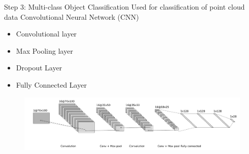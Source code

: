 \documentclass[9pt]{beamer}
\begin{document}



\begin{frame}[fragile]{Step 3: Multi-class Object Classification}
	Used for classification of point cloud data Convolutional Neural Network (CNN)

	\begin{itemize}
		\item Convolutional layer
		\item Max Pooling layer
		\item Dropout Layer
		\item Fully Connected Layer
	\end{itemize}

	\begin{figure}
		\centering
		\includegraphics[width=\textwidth]{images/object_net.pdf}

	\end{figure}
\end{frame}

\end{document}
